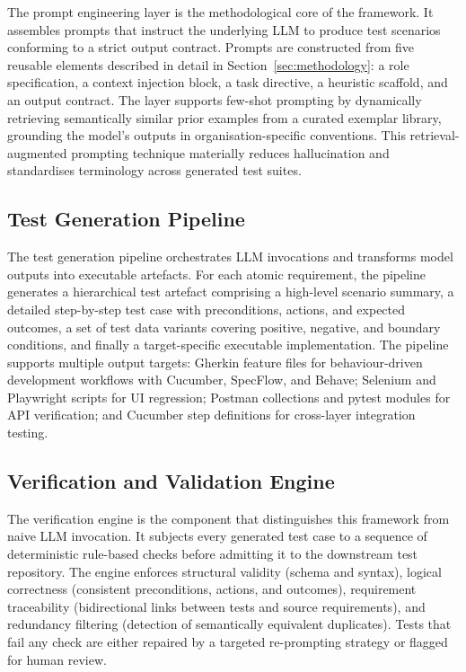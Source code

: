 \documentclass[11pt,letterpaper]{article}
\begin{document}
The prompt engineering layer is the methodological core of the framework. It assembles prompts that instruct the underlying LLM to produce test scenarios conforming to a strict output contract. Prompts are constructed from five reusable elements described in detail in Section~\ref{sec:methodology}: a role specification, a context injection block, a task directive, a heuristic scaffold, and an output contract. The layer supports few-shot prompting by dynamically retrieving semantically similar prior examples from a curated exemplar library, grounding the model's outputs in organisation-specific conventions. This retrieval-augmented prompting technique materially reduces hallucination and standardises terminology across generated test suites.

\subsection{Test Generation Pipeline}

The test generation pipeline orchestrates LLM invocations and transforms model outputs into executable artefacts. For each atomic requirement, the pipeline generates a hierarchical test artefact comprising a high-level scenario summary, a detailed step-by-step test case with preconditions, actions, and expected outcomes, a set of test data variants covering positive, negative, and boundary conditions, and finally a target-specific executable implementation. The pipeline supports multiple output targets: Gherkin feature files for behaviour-driven development workflows with Cucumber, SpecFlow, and Behave; Selenium and Playwright scripts for UI regression; Postman collections and pytest modules for API verification; and Cucumber step definitions for cross-layer integration testing.

\subsection{Verification and Validation Engine}

The verification engine is the component that distinguishes this framework from naive LLM invocation. It subjects every generated test case to a sequence of deterministic rule-based checks before admitting it to the downstream test repository. The engine enforces structural validity (schema and syntax), logical correctness (consistent preconditions, actions, and outcomes), requirement traceability (bidirectional links between tests and source requirements), and redundancy filtering (detection of semantically equivalent duplicates). Tests that fail any check are either repaired by a targeted re-prompting strategy or flagged for human review.
\end{document}
